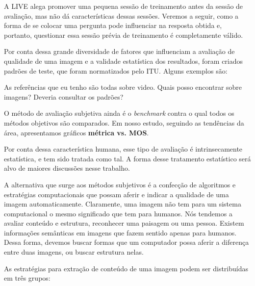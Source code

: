 A LIVE alega promover uma pequena sessão de treinamento antes da sessão de avaliação, mas não dá características dessas sessões. Veremos a seguir, como a forma de se colocar uma pergunta pode influenciar na resposta obtida e, portanto, questionar essa sessão prévia de treinamento é completamente válido.

Por conta dessa grande diversidade de fatores que influenciam a avaliação de qualidade de uma imagem e a validade estatística dos resultados, foram criados padrões de teste, que foram normatizados pelo ITU. Alguns exemplos são:

\begin{description}
	\item{As referências que eu tenho são todas sobre video.} Quais posso encontrar sobre imagens? Deveria consultar os padrões?
\end{description}

O método de avaliação subjetiva ainda é o \emph{benchmark} contra o qual todos os métodos objetivos são comparados. Em nosso estudo, seguindo as tendências da área, apresentamos gráficos \textbf{métrica vs. MOS}.

Por conta dessa característica humana, esse tipo de avaliação é intrinsecamente estatística, e tem sido tratada como tal. A forma desse tratamento estatístico será alvo de maiores discussões nesse trabalho.

A alternativa que surge aos métodos subjetivos é a confecção de algoritmos e estratégias computacionais que possam aferir e indicar a qualidade de uma imagem automaticamente. Claramente, uma imagem não tem para um sistema computacional o mesmo significado que tem para humanos. Nós tendemos a avaliar conteúdo e estrutura, reconhecer uma paisagem ou uma pessoa. Existem informações semânticas em imagens que fazem sentido apenas para humanos. Dessa forma, devemos buscar formas que um computador possa aferir a diferença entre duas imagens, ou buscar estrutura nelas.

As estratégias para extração de conteúdo de uma imagem podem ser distribuídas em três grupos:

